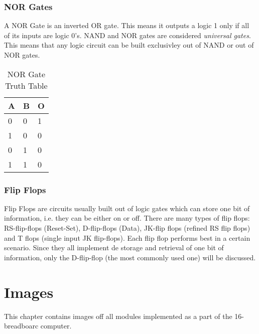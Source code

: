\documentclass[11pt]{informatics-report}
\begin{document}
\subsection{NOR Gates}
A NOR Gate is an inverted OR gate. This means it outputs a logic 1 only if all of its inputs are logic 0's.
NAND and NOR gates are considered \emph{universal gates}. This means that any logic circuit can be built exclusivley out of NAND or out of NOR gates.
\begin{table}[h]
\centering
\begin{tabular}{l|l|l}
\hline
\multicolumn{1}{|l|}{\textbf{A}} & \textbf{B} & \multicolumn{1}{l|}{\textbf{O}} \\ \hline
0                                & 0          & 1                               \\
1                                & 0          & 0                               \\
0                                & 1          & 0                               \\
1                                & 1          & 0
\end{tabular}
\caption{NOR Gate Truth Table}
\label{tab:nor-table}
\end{table}

\subsection{Flip Flops}
Flip Flops are circuits usually built out of logic gates which can store one bit of information, i.e. they can be either on or off. There are many types of flip flops: RS-flip-flops (Reset-Set), D-flip-flops (Data), JK-flip flops (refined RS flip flops) and T flops (single input JK flip-flops). Each flip flop performs best in a certain scenario. Since they all implement de storage and retrieval of one bit of information, only the D-flip-flop (the most commonly used one) will be discussed. \\


\chapter{Images}
This chapter contains images off all modules implemented as a part of the 16-breadboarc computer.







\end{document}
